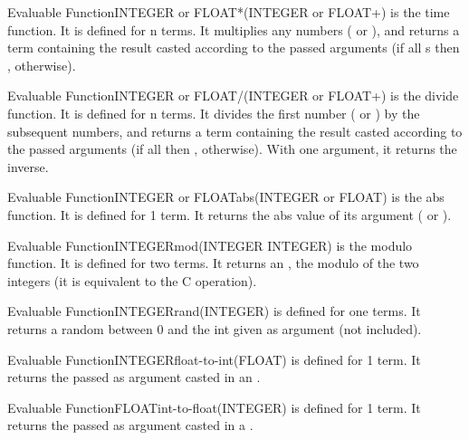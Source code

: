 \begin{typeefa}{Evaluable Function}{INTEGER or FLOAT}{*}{({INTEGER or FLOAT}+)}
is the time function. It is defined for n terms. It multiplies any numbers
( or ), and returns a term containing the result casted according
to the passed arguments (if all s then ,  otherwise).
\end{typeefa}

\begin{typeefa}{Evaluable Function}{INTEGER or FLOAT}{/}{({INTEGER or FLOAT}+)}
is the divide function. It is defined for n terms. It divides the first
number ( or ) by the subsequent numbers, and returns a term
containing the result casted according to the passed arguments (if all 
then ,  otherwise). With one argument, it returns the inverse.
\end{typeefa}

\begin{typeefa}{Evaluable Function}{INTEGER or FLOAT}{abs}{({INTEGER or FLOAT})}
is the abs function. It is defined for 1 term. It returns the abs value of
its argument ( or ).
\end{typeefa}

\begin{typeefa}{Evaluable Function}{INTEGER}{mod}{(INTEGER INTEGER)}
is the modulo function. It is defined for two  terms. It returns an
, the modulo of the two integers (it is equivalent to the C
\code{\%} operation).
\end{typeefa}

\begin{typeefa}{Evaluable Function}{INTEGER}{rand}{(INTEGER)}
 is defined for one  terms. It returns a random
 between 0 and the int given as argument (not included).
\end{typeefa}

\begin{typeefa}{Evaluable Function}{INTEGER}{float-to-int}{({FLOAT})}
is defined for 1 term. It returns the  passed as argument casted in
an . 
\end{typeefa}

\begin{typeefa}{Evaluable Function}{FLOAT}{int-to-float}{({INTEGER})}
is defined for 1 term. It returns the  passed as argument casted
in a .
\end{typeefa}

